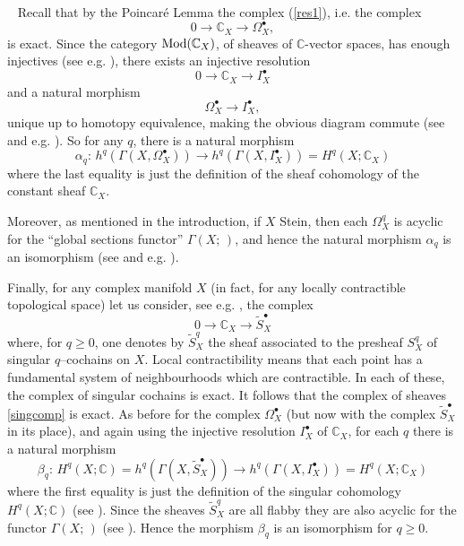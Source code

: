 \documentclass[12pt]{article}
\newcommand{\CC}{\mathbb{C}}
\DeclareMathOperator{\Mod}{\rm Mod}
\newcounter{numero}[section]
\renewcommand{\thenumero}{(\arabic{section}.\arabic{numero})}
\newenvironment{nota}{\medskip
\refstepcounter{numero}\noindent {\sc  \thenumero\ Remark.}\
}{\vspace{1ex}\par}
\begin{document}
\begin{nota}
Recall that by the Poincaré Lemma the complex (\ref{res1}), i.e. the complex $$ 0 \rightarrow \CC_X \rightarrow \Omega_X^\bullet,$$  is  exact. Since the category $\Mod(\CC_X)$, of sheaves of $\CC$-vector spaces, has enough injectives (see e.g. \cite[Ex. 2.3.12]{weibel-1994}), there exists an injective resolution $$0 \rightarrow  \CC_X \rightarrow I_X^\bullet$$ and a natural morphism $$ \Omega_X^\bullet \rightarrow I_X^\bullet,$$ unique up to homotopy equivalence, making the obvious diagram commute (see \cite[Rq. 3, Th. 2.4.1]{GRO-Tohoku} and e.g. \cite[2.5]{weibel-1994}). So for any $q$,  there is a natural morphism
$$\alpha_q: \,  h^q(\Gamma(X,\Omega_X^\bullet)) \rightarrow h^q(\Gamma(X,I^\bullet_X)) = H^q(X;\CC_X)$$ where the last equality is just the definition of the sheaf cohomology of the constant sheaf $\CC_X$.

Moreover, as mentioned in the introduction, if $X$ Stein, then each $\Omega^q_X$ is acyclic for the ``global sections functor'' $\Gamma(X;\,)$, and hence the natural morphism $\alpha_q$ is an isomorphism (see \cite[Rq. 3, Th. 2.4.1]{GRO-Tohoku} and e.g. \cite[2.5]{weibel-1994}).

Finally, for any complex manifold $X$ (in fact, for any locally contractible topological space) let us consider, see e.g. \cite[Ch. 4, Th. 4.14]{Ramanan2005}, the complex
\begin{equation}\label{singcomp}0 \rightarrow \CC_X \rightarrow \widetilde{S}_X^\bullet\end{equation}
where, for $q\geq 0$, one denotes by $\widetilde{S}_X^q$ the sheaf associated to the presheaf ${S}_X^q$ of singular $q$--cochains on $X$. Local contractibility means that each point has a fundamental system of neighbourhoods which are contractible. In each of these, the complex of singular cochains is exact. It follows that the complex of sheaves \eqref{singcomp} is exact. As before for the complex $\Omega^\bullet_X$ (but now with the complex $\widetilde{S}_X^\bullet$ in its place), and again using the injective resolution $I^\bullet_X$ of $\CC_X$,   for each $q$ there is a natural morphism
$$\beta_q: \, H^q(X;\CC) = h^q(\Gamma(X,\widetilde{S}_X^\bullet)) \rightarrow h^q(\Gamma(X,I^\bullet_X)) = H^q(X;\CC_X)$$ where the first equality is just the definition of the singular cohomology $H^q(X;\CC)$ (see \cite[Ch. 4, Prop. 4.12]{Ramanan2005}). Since the sheaves $\widetilde{S}_X^q$ are all flabby they are also acyclic for the functor $\Gamma(X;\,)$ (see \cite[Ch. 4, ex. 1.10, 2 and Prop. 3.3]{Ramanan2005}). Hence the morphism $\beta_q$ is an isomorphism for  $q\geq 0$.


\end{nota}
\end{document}

